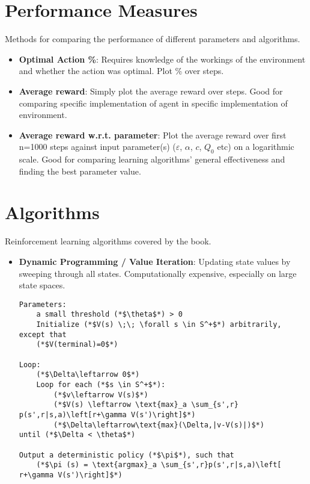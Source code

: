 \documentclass[12pt]{article}
\begin{document}
\section{Performance Measures}
Methods for comparing the performance of different parameters and algorithms.
\begin{itemize}
\item\textbf{Optimal Action \%}: Requires knowledge of the workings of the environment 
	and whether the action was optimal. Plot \% over steps.

\item\textbf{Average reward}: Simply plot the average reward over steps.
	Good for comparing specific implementation of agent in specific implementation of environment.

\item\textbf{Average reward w.r.t. parameter}: Plot the average reward over first n=1000 steps 
	against input parameter(s) ($\varepsilon$, $\alpha$, $c$, $Q_0$ etc) on a logarithmic scale.
	Good for comparing learning algorithms' general effectiveness and finding the best parameter value.

\end{itemize}

\section{Algorithms}
Reinforcement learning algorithms covered by the book.
\begin{itemize}
	\item\textbf{Dynamic Programming / Value Iteration}: Updating state values by sweeping through all states.
		Computationally expensive, especially on large state spaces.
		\begin{lstlisting}
Parameters:
	a small threshold (*$\theta$*) > 0 
	Initialize (*$V(s) \;\; \forall s \in S^+$*) arbitrarily, except that
	(*$V(terminal)=0$*) 

Loop:
	(*$\Delta\leftarrow 0$*)
	Loop for each (*$s \in S^+$*):
		(*$v\leftarrow V(s)$*)
		(*$V(s) \leftarrow \text{max}_a \sum_{s',r} p(s',r|s,a)\left[r+\gamma V(s')\right]$*)
		(*$\Delta\leftarrow\text{max}(\Delta,|v-V(s)|)$*)
until (*$\Delta < \theta$*)

Output a deterministic policy (*$\pi$*), such that
	(*$\pi (s) = \text{argmax}_a \sum_{s',r}p(s',r|s,a)\left[ r+\gamma V(s')\right]$*)
		\end{lstlisting}
\end{itemize}
\end{document}
